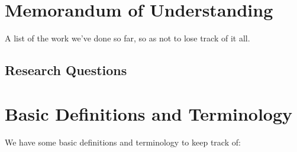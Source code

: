 \documentclass{article}
\begin{document}
\section{Memorandum of Understanding}

A list of the work we've done so far, so as not to lose track of it all.

\subsection{Research Questions}


\bigskip

\section{Basic Definitions and Terminology}

We have some basic definitions and terminology to keep track of:
\end{document}
